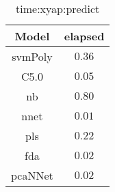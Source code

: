 \begin{table}[!ht]
	\centering
	\begin{tabular}{|c|c|}
		\hline
		Model & elapsed \\ \hline
		svmPoly & $0.36$ \\ \hline
		C5.0 & $0.05$ \\ \hline
		nb & $0.80$ \\ \hline
		nnet & $0.01$ \\ \hline
		pls & $0.22$ \\ \hline
		fda & $0.02$ \\ \hline
		pcaNNet & $0.02$ \\ \hline
	\end{tabular}
	\caption{time:xyap:predict}
	\label{tab:time:xyap:predict}
\end{table}
